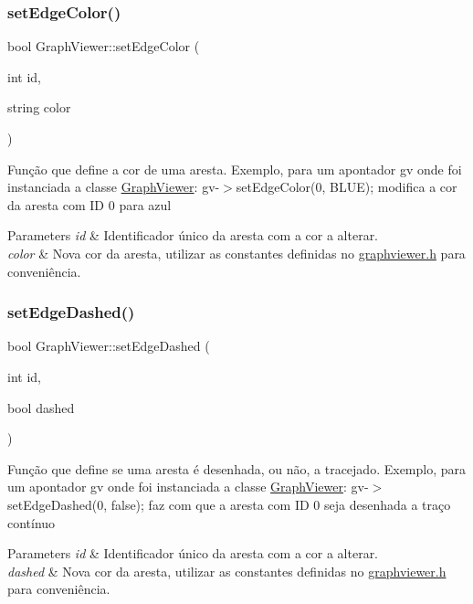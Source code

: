 \subsubsection{\texorpdfstring{set\+Edge\+Color()}{setEdgeColor()}}
{\footnotesize\ttfamily bool Graph\+Viewer\+::set\+Edge\+Color (\begin{DoxyParamCaption}\item[{int}]{id,  }\item[{string}]{color }\end{DoxyParamCaption})}

Função que define a cor de uma aresta. Exemplo, para um apontador gv onde foi instanciada a classe \hyperlink{class_graph_viewer}{Graph\+Viewer}\+: gv-\/$>$set\+Edge\+Color(0, B\+L\+U\+E); modifica a cor da aresta com ID 0 para azul


\begin{DoxyParams}{Parameters}
{\em id} & Identificador único da aresta com a cor a alterar. \\
\hline
{\em color} & Nova cor da aresta, utilizar as constantes definidas no \hyperlink{graphviewer_8h}{graphviewer.\+h} para conveniência. \\
\hline
\end{DoxyParams}
\hypertarget{class_graph_viewer_a1698f1c6b3a8e7cabc7b7d7cf42fc7f0}{}\label{class_graph_viewer_a1698f1c6b3a8e7cabc7b7d7cf42fc7f0} 
\subsubsection{\texorpdfstring{set\+Edge\+Dashed()}{setEdgeDashed()}}
{\footnotesize\ttfamily bool Graph\+Viewer\+::set\+Edge\+Dashed (\begin{DoxyParamCaption}\item[{int}]{id,  }\item[{bool}]{dashed }\end{DoxyParamCaption})}

Função que define se uma aresta é desenhada, ou não, a tracejado. Exemplo, para um apontador gv onde foi instanciada a classe \hyperlink{class_graph_viewer}{Graph\+Viewer}\+: gv-\/$>$set\+Edge\+Dashed(0, false); faz com que a aresta com ID 0 seja desenhada a traço contínuo


\begin{DoxyParams}{Parameters}
{\em id} & Identificador único da aresta com a cor a alterar. \\
\hline
{\em dashed} & Nova cor da aresta, utilizar as constantes definidas no \hyperlink{graphviewer_8h}{graphviewer.\+h} para conveniência. \\
\hline
\end{DoxyParams}
\hypertarget{class_graph_viewer_a69eb065145063e4dea41961e92e35c8e}{}\label{class_graph_viewer_a69eb065145063e4dea41961e92e35c8e} 

